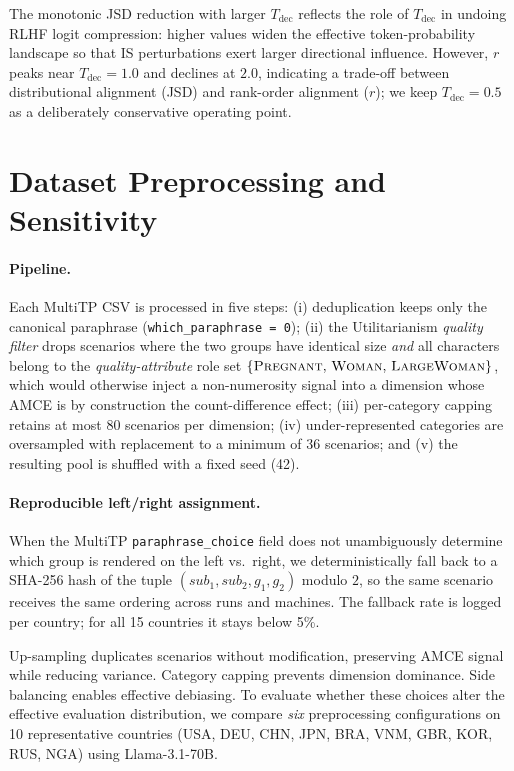\documentclass{article}
\begin{document}
The monotonic JSD reduction with larger $T_\text{dec}$ reflects the role of
$T_\text{dec}$ in undoing RLHF logit compression: higher values widen the effective
token-probability landscape so that IS perturbations exert larger directional
influence. However, $r$ peaks near $T_\text{dec}{=}1.0$ and declines at $2.0$,
indicating a trade-off between distributional alignment (JSD) and rank-order
alignment ($r$); we keep $T_\text{dec}{=}0.5$ as a deliberately conservative
operating point.

\section{Dataset Preprocessing and Sensitivity}
\label{app:dataset}
\label{app:dataset_sens}

\paragraph{Pipeline.}
Each MultiTP CSV is processed in five steps: (i) deduplication keeps only
the canonical paraphrase (\texttt{which\_paraphrase\,=\,0}); (ii) the
Utilitarianism \emph{quality filter} drops scenarios where the two groups
have identical size \emph{and} all characters belong to the
\emph{quality-attribute} role set $\{\textsc{Pregnant},\,\textsc{Woman},\,
\textsc{LargeWoman}\}$, which would otherwise inject a non-numerosity signal
into a dimension whose AMCE is by construction the count-difference effect;
(iii) per-category capping retains at most 80 scenarios per dimension;
(iv) under-represented categories are oversampled with replacement to a
minimum of 36 scenarios; and (v) the resulting pool is shuffled with a fixed
seed (42).

\paragraph{Reproducible left/right assignment.}
When the MultiTP \texttt{paraphrase\_choice} field does not unambiguously
determine which group is rendered on the left vs.\ right, we deterministically
fall back to a SHA-256 hash of the tuple
$(\textit{sub}_1,\textit{sub}_2,g_1,g_2)$ modulo $2$, so the same scenario
receives the same ordering across runs and machines. The fallback rate is
logged per country; for all 15 countries it stays below 5\%.

Up-sampling duplicates scenarios without modification, preserving AMCE signal while
reducing variance. Category capping prevents dimension dominance. Side balancing
enables effective debiasing. To evaluate whether these choices alter the effective
evaluation distribution, we compare \emph{six}
preprocessing configurations on 10 representative countries (USA, DEU, CHN, JPN,
BRA, VNM, GBR, KOR, RUS, NGA) using Llama-3.1-70B.
\end{document}
